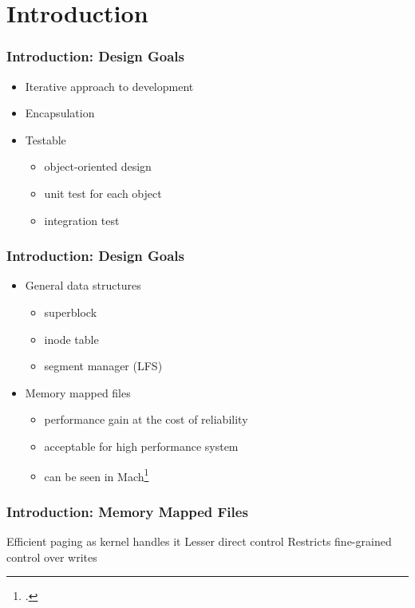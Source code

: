 \section{Introduction}

\begin{frame}
\frametitle{Introduction: Design Goals}
	\begin{itemize}[<+->]
	\setlength\itemsep{1em}
	\item Iterative approach to development
	\item Encapsulation
	\item Testable
		\begin{itemize}
			\item object-oriented design
			\item unit test for each object
			\item integration test
		\end{itemize}
\end{itemize}
\end{frame}

\begin{frame}
	\frametitle{Introduction: Design Goals \continued}
	\begin{itemize}[<+->]
		\setlength\itemsep{1em}
		\item General data structures
			\begin{itemize}
				\item superblock
				\item inode table
				\item segment manager (LFS)
			\end{itemize}
		\item Memory mapped files
			\begin{itemize}
				\item performance gain at the cost of reliability
				\item acceptable for high performance system
				\item can be seen in Mach\footcite{accetta1986mach}
			\end{itemize}
	\end{itemize}
\end{frame}

\begin{frame}
	\frametitle{Introduction: Memory Mapped Files}
	\begin{itemize}[<+->]
		\setlength\itemsep{1em}
		\pro Efficient paging as kernel handles it
		\con Lesser direct control
		\con Restricts fine-grained control over writes
	\end{itemize}
\end{frame}
